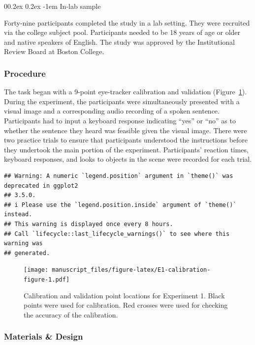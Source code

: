 \documentclass[
  man,floatsintext]{apa6}
\makeatletter
\let\oldparagraph\paragraph
\renewcommand{\paragraph}[1]{\oldparagraph{#1}\mbox{}}
\renewcommand{\paragraph}{\@startsection{paragraph}{4}{\parindent}%
  {0\baselineskip \@plus 0.2ex \@minus 0.2ex}%
  {-1em}%
  {\normalfont\normalsize\bfseries\itshape\typesectitle}}
\makeatother
\begin{document}
\paragraph{In-lab sample}\label{in-lab-sample}

Forty-nine participants completed the study in a lab setting. They were recruited via the college subject pool. Participants needed to be 18 years of age or older and native speakers of English. The study was approved by the Institutional Review Board at Boston College.

\subsubsection{Procedure}\label{procedure}

The task began with a 9-point eye-tracker calibration
and validation (Figure~\ref{fig:E1-calibration-figure}).
During the experiment, the participants were
simultaneously presented with a visual image and a corresponding audio
recording of a spoken sentence. Participants had to input a keyboard
response indicating ``yes'' or ``no'' as to whether the sentence they heard
was feasible given the visual image. There were two practice trials to
ensure that participants understood the instructions
before they undertook the main portion of the experiment. Participants'
reaction times, keyboard responses, and looks to objects in the scene
were recorded for each trial.

\begin{verbatim}
## Warning: A numeric `legend.position` argument in `theme()` was deprecated in ggplot2
## 3.5.0.
## i Please use the `legend.position.inside` argument of `theme()` instead.
## This warning is displayed once every 8 hours.
## Call `lifecycle::last_lifecycle_warnings()` to see where this warning was
## generated.
\end{verbatim}

\begin{figure}
\centering
\texttt{[image: manuscript\_files/figure-latex/E1-calibration-figure-1.pdf]}
\caption{\label{fig:E1-calibration-figure}Calibration and validation point locations for Experiment 1. Black points were used for calibration. Red crosses were used for checking the accuracy of the calibration.}
\end{figure}

\subsubsection{Materials \& Design}\label{materials-design}
\end{document}
